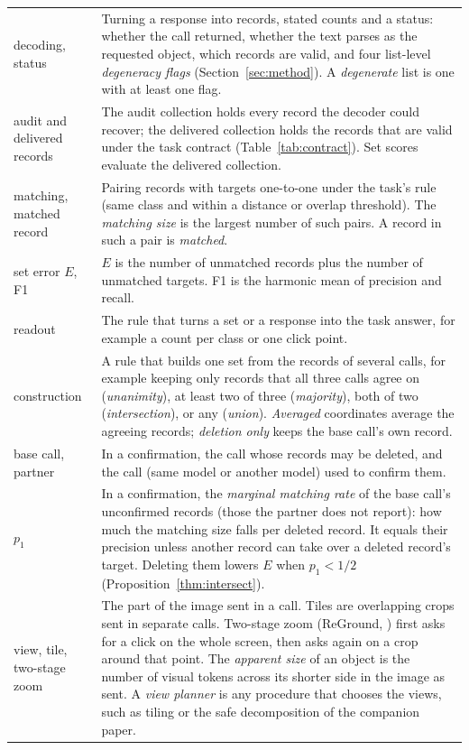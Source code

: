 \begin{table}[tp]
\begin{tabular}{@{}>{\raggedright\arraybackslash}p{2.6cm}>{\raggedright\arraybackslash}p{12.8cm}@{}}
decoding, status & Turning a response into records, stated counts and a status: whether the call returned, whether the text parses as the requested object, which records are valid, and four list-level \emph{degeneracy flags} (Section~\ref{sec:method}). A \emph{degenerate} list is one with at least one flag. \\
audit and delivered records & The audit collection holds every record the decoder could recover; the delivered collection holds the records that are valid under the task contract (Table~\ref{tab:contract}). Set scores evaluate the delivered collection. \\
matching, matched record & Pairing records with targets one-to-one under the task's rule (same class and within a distance or overlap threshold). The \emph{matching size} is the largest number of such pairs. A record in such a pair is \emph{matched}. \\
set error $E$, F1 & $E$ is the number of unmatched records plus the number of unmatched targets. F1 is the harmonic mean of precision and recall. \\
readout & The rule that turns a set or a response into the task answer, for example a count per class or one click point. \\
construction & A rule that builds one set from the records of several calls, for example keeping only records that all three calls agree on (\emph{unanimity}), at least two of three (\emph{majority}), both of two (\emph{intersection}), or any (\emph{union}). \emph{Averaged} coordinates average the agreeing records; \emph{deletion only} keeps the base call's own record. \\
base call, partner & In a confirmation, the call whose records may be deleted, and the call (same model or another model) used to confirm them. \\
$p_1$ & In a confirmation, the \emph{marginal matching rate} of the base call's unconfirmed records (those the partner does not report): how much the matching size falls per deleted record. It equals their precision unless another record can take over a deleted record's target. Deleting them lowers $E$ when $p_1<1/2$ (Proposition~\ref{thm:intersect}). \\
view, tile, two-stage zoom & The part of the image sent in a call. Tiles are overlapping crops sent in separate calls. Two-stage zoom (ReGround, \citealp{li2025screenspotpro}) first asks for a click on the whole screen, then asks again on a crop around that point. The \emph{apparent size} of an object is the number of visual tokens across its shorter side in the image as sent. A \emph{view planner} is any procedure that chooses the views, such as tiling or the safe decomposition of the companion paper. \\

\end{tabular}
\end{table}
